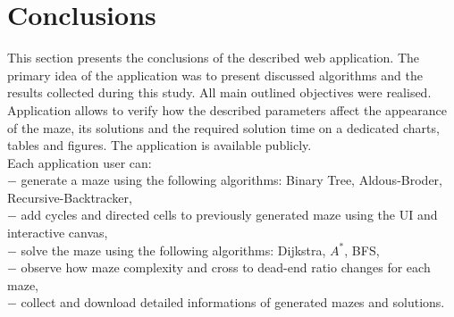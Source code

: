 \section{Conclusions}
This section presents the conclusions of the described web application. The primary idea of the application was to present discussed
algorithms and the results collected during this study. All main outlined objectives were realised. Application allows to verify how the described parameters
affect the appearance of the maze, its solutions and the required solution time on a dedicated charts, tables and figures. The application is available publicly.\\
Each application user can:\\
$-$ generate a maze using the following algorithms: Binary Tree, Aldous-Broder, Recursive-Backtracker,\\
$-$ add cycles and directed cells to previously generated maze using the UI and interactive canvas,\\
$-$ solve the maze using the following algorithms: Dijkstra, $A^*$, BFS,\\
$-$ observe how maze complexity and cross to dead-end ratio changes for each maze,\\
$-$ collect and download detailed informations of generated mazes and solutions.\\

 